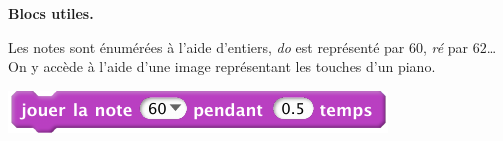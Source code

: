 \documentclass[class=report,crop=false, 12pt]{standalone}
\begin{document}
\begin{activite}
\medskip

\textbf{Blocs utiles.}

Les notes sont énumérées à l'aide d'entiers, \emph{do} est représenté par $60$, 
\emph{ré} par $62$\ldots On y accède à l'aide d'une image représentant les touches d'un piano.

\begin{center}
  \includegraphics[scale=\scalebloc]{bloc-09-ex1} 
\end{center}

\end{activite}
\end{document}
